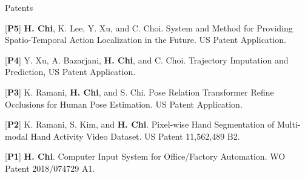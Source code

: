\begin{cventries}
\vspace{-.5em}
\cvpub
{Patents}{
\begin{cvitems}
    \item {[\textbf{P5}] \textbf{H. Chi}, K. Lee, Y. Xu, and C. Choi. System and Method for Providing Spatio-Temporal Action Localization in the Future. US Patent Application.}
    \item {[\textbf{P4}] Y. Xu, A. Bazarjani, \textbf{H. Chi}, and C. Choi. Trajectory Imputation and Prediction, US Patent Application.}
    \item {[\textbf{P3}] K. Ramani, \textbf{H. Chi}, and S. Chi. Pose Relation Transformer Refine Occlusions for Human Pose Estimation. US Patent Application.}
    \item {[\textbf{P2}] K. Ramani, S. Kim, and \textbf{H. Chi}. Pixel-wise Hand Segmentation of Multi-modal Hand Activity Video Dataset. US Patent 11,562,489 B2.}
    \item {[\textbf{P1}] \textbf{H. Chi}. Computer Input System for Office/Factory Automation. WO Patent 2018/074729 A1.}
\end{cvitems}
}


\end{cventries}
